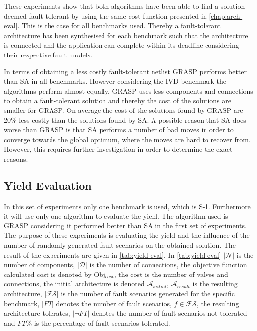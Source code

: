 These experiments show that both algorithms have been able to find a solution deemed fault-tolerant by using the same cost function presented in \autoref{chap:arch-eval}. This is the case for all benchmarks used. Thereby a fault-tolerant architecture has been synthesised for each benchmark such that the architecture is connected and the application can complete within its deadline considering their respective fault models.

In terms of obtaining a less costly fault-tolerant netlist GRASP performs better than SA in all benchmarks. However considering the IVD benchmark the algorithms perform almost equally. GRASP uses less components and connections to obtain a fault-tolerant solution and thereby the cost of the solutions are smaller for GRASP. On average the cost of the solutions found by GRASP are 20\% less costly than the solutions found by SA. A possible reason that SA does worse than GRASP is that SA performs a number of bad moves in order to converge towards the global optimum, where the moves are hard to recover from. However, this requires further investigation in order to determine the exact reasons.


\subsection{Yield Evaluation}
\label{sec:yield-eval}
In this set of experiments only one benchmark is used, which is S-1. Furthermore it will use only one algorithm to evaluate the yield. The algorithm used is GRASP considering it performed better than SA in the first set of experiments. The purpose of these experiments is evaluating the yield and the influence of the number of randomly generated fault scenarios on the obtained solution. The result of the experiments are given in \autoref{tab:yield-eval}. In \autoref{tab:yield-eval} $|\mathcal{N}|$ is the number of components, $|\mathcal{D}|$ is the number of connections, the objective function calculated cost is denoted by Obj$_{cost}$, the cost is the number of valves and connections, the initial architecture is denoted $\mathcal{A}_{initial}$, $\mathcal{A}_{result}$ is the resulting architecture, $|\mathcal{FS}|$ is the number of fault scenarios generated for the specific benchmark, $|FT|$ denotes the number of fault scenarios, $f \in \mathcal{FS}$, the resulting architecture tolerates, $|\neg FT|$ denotes the number of fault scenarios not tolerated and $FT\%$ is the percentage of fault scenarios tolerated.


